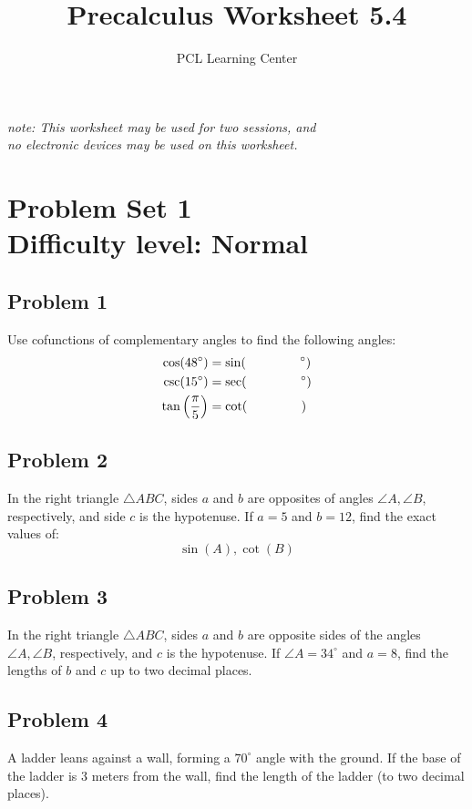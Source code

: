 \documentclass[12pt]{article}
\title{Precalculus Worksheet 5.4}
\author{PCL Learning Center}
\date{}
\begin{document}
\maketitle

\begin{center}
    \textit{note: This worksheet may be used for two sessions, and\\no electronic devices may be used on this worksheet.}
\end{center}

\section*{Problem Set 1\\Difficulty level: Normal}
\subsection*{Problem 1}
Use cofunctions of complementary angles to find the following angles:
\begin{align*}
    \cos(48^{\circ}) &= \sin(\hspace{1.5cm}^{\circ}) \\
    \csc(15^{\circ}) &= \sec(\hspace{1.5cm}^{\circ}) \\
    \tan\left(\dfrac{\pi}{5}\right) &= \cot(\hspace{1.5cm})
\end{align*}

\subsection*{Problem 2}
In the right triangle \(\triangle ABC\), sides \(a\) and \(b\) are opposites of angles \(\angle A, \angle B\), respectively, and side \(c\) is the hypotenuse. If \(a=5\) and \(b=12\), find the exact values of:
\[\sin(A), \cot(B)\]

\subsection*{Problem 3}
In the right triangle \(\triangle ABC\), sides \(a\) and \(b\) are opposite sides of the angles \(\angle A, \angle B\), respectively, and \(c\) is the hypotenuse. If \(\angle A=34^{\circ}\) and \(a=8\), find the lengths of \(b\) and \(c\) up to two decimal places.

\subsection*{Problem 4}
A ladder leans against a wall, forming a \(70^\circ\) angle with the ground. If the base of the ladder is 3 meters from the wall, find the length of the ladder (to two decimal places).
\end{document}
